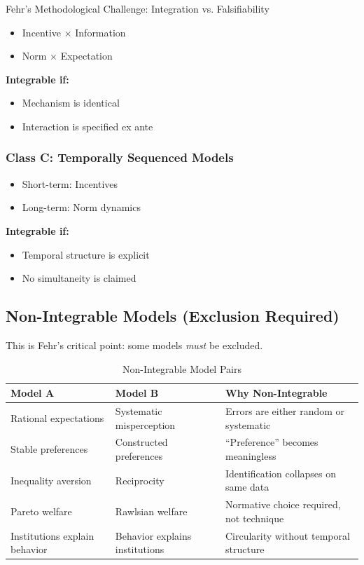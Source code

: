 \begin{chapter}{Fehr's Methodological Challenge: Integration vs. Falsifiability}
\begin{itemize}[noitemsep]
    \item Incentive $\times$ Information
    \item Norm $\times$ Expectation
\end{itemize}

\textbf{Integrable if:}
\begin{itemize}[noitemsep]
    \item Mechanism is identical
    \item Interaction is specified ex ante
\end{itemize}

\subsubsection{Class C: Temporally Sequenced Models}

\begin{itemize}[noitemsep]
    \item Short-term: Incentives
    \item Long-term: Norm dynamics
\end{itemize}

\textbf{Integrable if:}
\begin{itemize}[noitemsep]
    \item Temporal structure is explicit
    \item No simultaneity is claimed
\end{itemize}

\subsection{Non-Integrable Models (Exclusion Required)}

This is Fehr's critical point: some models \textit{must} be excluded.

\begin{table}[h]
\centering
\caption{Non-Integrable Model Pairs}
\label{tab:non-integrable}
\renewcommand{\arraystretch}{1.4}
\small
\begin{tabular}{@{}p{4cm}p{4cm}p{4cm}@{}}
\toprule
\textbf{Model A} & \textbf{Model B} & \textbf{Why Non-Integrable} \\
\midrule
Rational expectations & Systematic misperception & Errors are either random or systematic \\
Stable preferences & Constructed preferences & ``Preference'' becomes meaningless \\
Inequality aversion & Reciprocity & Identification collapses on same data \\
Pareto welfare & Rawlsian welfare & Normative choice required, not technique \\
Institutions explain behavior & Behavior explains institutions & Circularity without temporal structure \\
\bottomrule
\end{tabular}
\end{table}


\end{chapter}
